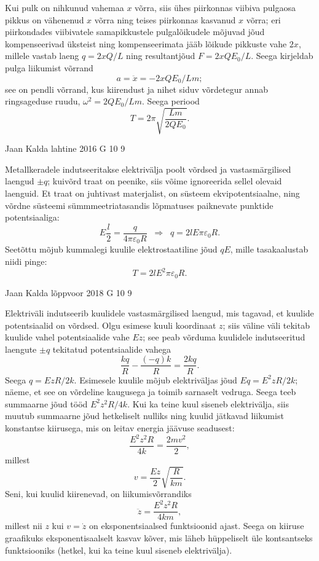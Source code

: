 \documentclass[11pt, twoside]{article}
\begin{document}
{{\osa Kui pulk on nihkunud vahemaa $x$ võrra, siis ühes piirkonnas viibiva pulgaosa pikkus
on vähenenud $x$ võrra ning teises piirkonnas kasvanud $x$ võrra; eri piirkondades viibivatele
samapikkustele pulgalõikudele mõjuvad jõud kompenseerivad üksteist ning kompenseerimata jääb lõikude pikkuste vahe $2x$, millele vastab laeng
$q=2xQ/L$ ning resultantjõud $F=2xQE_0/L$.
Seega kirjeldab pulga liikumist võrrand
\[
a=\ddot x= -2xQE_0/Lm;
\]
see on pendli võrrand, kus kiirendust ja nihet siduv võrdetegur annab ringsageduse ruudu,
$\omega^2=2QE_0/Lm$. Seega periood 
\[ T=2\pi\sqrt{\frac{Lm}{2QE_0}}.\]
\fi
}

{Jaan Kalda} %
{lahtine} %
{2016} %
{G 10} %
{9} %
{

\ifSolution
Metallkeradele indutseeritakse elektrivälja poolt võrdsed ja vastasmärgilised laengud $\pm q$; kuivõrd traat on peenike,
siis võime ignoreerida sellel olevaid laenguid. Et traat on juhtivast materjalist, on süsteem ekvipotentsiaalne,
ning võrdne süsteemi sümmmeetriatasandis lõpmatuses paiknevate punktide potentsiaaliga:
$$E\frac l2=\frac q{4\pi\varepsilon_0R}\;\;\Rightarrow\;\; q=2lE\pi\varepsilon_0R.$$
Seetõttu mõjub kummalegi kuulile elektrostaatiline jõud $qE$, mille tasakaalustab niidi pinge:
$$T=2lE^2\pi\varepsilon_0R.$$
\fi
}

{Jaan Kalda} %
{lõppvoor} %
{2018} %
{G 10} %
{9} %
{

\ifSolution
Elektriväli indutseerib kuulidele vastasmärgilised laengud, mis tagavad, et kuulide potentsiaalid on võrdsed. Olgu esimese kuuli koordinaat $z$; siis väline väli tekitab kuulide vahel potentsiaalide vahe $Ez$; see peab võrduma kuulidele indutseeritud laengute $\pm q$ tekitatud potentsiaalide vahega
\[
\frac{kq}{R}-\frac{(-q)k}{R}=\frac{2kq}{R}.
\]
Seega $q=EzR/2k$. Esimesele kuulile mõjub elektriväljas jõud $Eq=E^2zR/2k$; näeme, et see on võrdeline kaugusega ja toimib sarnaselt vedruga. Seega teeb summaarne jõud tööd $E^2z^2R/4k$. Kui ka teine kuul siseneb elektrivälja, siis muutub summaarne jõud hetkeliselt nulliks ning kuulid jätkavad liikumist konstantse kiirusega, mis on leitav energia jäävuse seadusest: 
\[
\frac{E^2z^2R}{4k}=\frac{2mv^2}{2},
\]
millest
\[
v=\frac{Ez}{2}\sqrt{\frac{R}{km}}.
\]
Seni, kui kuulid kiirenevad, on liikumisvõrrandiks
\[
\ddot z=\frac{E^2z^2R}{4km},
\]
millest nii $z$ kui $v=\dot z$ on eksponentsiaalsed funktsioonid ajast. Seega on kiiruse graafikuks eksponentisaalselt kasvav kõver, mis läheb hüppeliselt üle kontsantseks funktsiooniks (hetkel, kui ka teine kuul siseneb elektrivälja).
\fi
}

}
\end{document}
